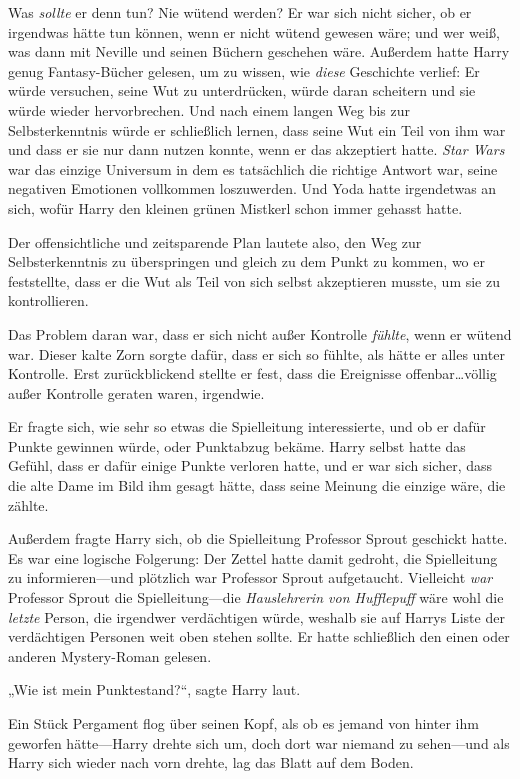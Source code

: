 {Was \emph{sollte} er denn tun? Nie wütend werden? Er war sich nicht sicher, ob er irgendwas hätte tun können, wenn er nicht wütend gewesen wäre; und wer weiß, was dann mit Neville und seinen Büchern geschehen wäre. Außerdem hatte Harry genug Fantasy-Bücher gelesen, um zu wissen, wie \emph{diese} Geschichte verlief: Er würde versuchen, seine Wut zu unterdrücken, würde daran scheitern und sie würde wieder hervorbrechen. Und nach einem langen Weg bis zur Selbsterkenntnis würde er schließlich lernen, dass seine Wut ein Teil von ihm war und dass er sie nur dann nutzen konnte, wenn er das akzeptiert hatte. \emph{Star Wars} war das einzige Universum in dem es tatsächlich die richtige Antwort war, seine negativen Emotionen vollkommen loszuwerden. Und Yoda hatte irgendetwas an sich, wofür Harry den kleinen grünen Mistkerl schon immer gehasst hatte.

Der offensichtliche und zeitsparende Plan lautete also, den Weg zur Selbsterkenntnis zu überspringen und gleich zu dem Punkt zu kommen, wo er feststellte, dass er die Wut als Teil von sich selbst akzeptieren musste, um sie zu kontrollieren.

Das Problem daran war, dass er sich nicht außer Kontrolle \emph{fühlte}, wenn er wütend war. Dieser kalte Zorn sorgte dafür, dass er sich so fühlte, als hätte er alles unter Kontrolle. Erst zurückblickend stellte er fest, dass die Ereignisse offenbar…völlig außer Kontrolle geraten waren, irgendwie.

Er fragte sich, wie sehr so etwas die Spielleitung interessierte, und ob er dafür Punkte gewinnen würde, oder Punktabzug bekäme. Harry selbst hatte das Gefühl, dass er dafür einige Punkte verloren hatte, und er war sich sicher, dass die alte Dame im Bild ihm gesagt hätte, dass seine Meinung die einzige wäre, die zählte.

Außerdem fragte Harry sich, ob die Spielleitung Professor Sprout geschickt hatte. Es war eine logische Folgerung: Der Zettel hatte damit gedroht, die Spielleitung zu informieren—und plötzlich war Professor Sprout aufgetaucht. Vielleicht \emph{war} Professor Sprout die Spielleitung—die \emph{Hauslehrerin von Hufflepuff} wäre wohl die \emph{letzte} Person, die irgendwer verdächtigen würde, weshalb sie auf Harrys Liste der verdächtigen Personen weit oben stehen sollte. Er hatte schließlich den einen oder anderen Mystery-Roman gelesen.

„Wie ist mein Punktestand?“, sagte Harry laut.

Ein Stück Pergament flog über seinen Kopf, als ob es jemand von hinter ihm geworfen hätte—Harry drehte sich um, doch dort war niemand zu sehen—und als Harry sich wieder nach vorn drehte, lag das Blatt auf dem Boden.

}
